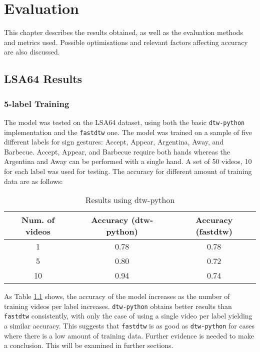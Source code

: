 \documentclass[final,rdr32.tex]{subfiles}
\begin{document}
\chapter{Evaluation}

This chapter describes the results obtained, as well as the evaluation methods and metrics used. Possible optimisations and relevant factors affecting accuracy are also discussed.

\section{LSA64 Results}

\subsection{5-label Training}

The model was tested on the LSA64 dataset, using both the basic \verb|dtw-python| implementation and the \verb|fastdtw| one. The model was trained on a sample of five different labels for sign gestures: Accept, Appear, Argentina, Away, and Barbecue. Accept, Appear, and Barbecue require both hands whereas the Argentina and Away can be performed with a single hand. A set of 50 videos, 10 for each label was used for testing. The accuracy for different amount of training data are as follows:

\begin{table}[!h]
    \begin{center}
        \begin{tabular}{ |c|c|c| }
            \hline
            Num. of videos & Accuracy (dtw-python) & Accuracy (fastdtw) \\
            \hline
            1              & 0.78                  & 0.78               \\
            5              & 0.80                  & 0.72               \\
            10             & 0.94                  & 0.74               \\
            \hline
        \end{tabular}
    \end{center}
    \caption{Results using dtw-python}
    \label{tab:accuracy}
\end{table}

As Table \ref{tab:accuracy} shows, the accuracy of the model increases as the number of training videos per label increases. \verb|dtw-python| obtains better results than \verb|fastdtw| consistently, with only the case of using a single video per label yielding a similar accuracy. This suggests that \verb|fastdtw| is as good as \verb|dtw-python| for cases where there is a low amount of training data. Further evidence is needed to make a conclusion. This will be examined in further sections.
\end{document}
